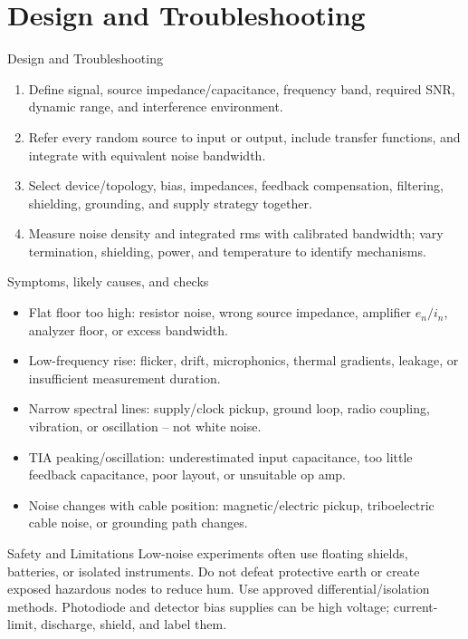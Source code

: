 \documentclass[10pt,letterpaper]{article}
\begin{document}
\section{Design and Troubleshooting}
\begin{CornellExamBox}{Design and Troubleshooting}
\begin{enumerate}
  \item Define signal, source impedance/capacitance, frequency band, required SNR, dynamic range, and interference environment.
  \item Refer every random source to input or output, include transfer functions, and integrate with equivalent noise bandwidth.
  \item Select device/topology, bias, impedances, feedback compensation, filtering, shielding, grounding, and supply strategy together.
  \item Measure noise density and integrated rms with calibrated bandwidth; vary termination, shielding, power, and temperature to identify mechanisms.
\end{enumerate}\end{CornellExamBox}
\begin{CornellExamBox}{Symptoms, likely causes, and checks}
\begin{itemize}
  \item Flat floor too high: resistor noise, wrong source impedance, amplifier $e_n/i_n$, analyzer floor, or excess bandwidth.
  \item Low-frequency rise: flicker, drift, microphonics, thermal gradients, leakage, or insufficient measurement duration.
  \item Narrow spectral lines: supply/clock pickup, ground loop, radio coupling, vibration, or oscillation -- not white noise.
  \item TIA peaking/oscillation: underestimated input capacitance, too little feedback capacitance, poor layout, or unsuitable op amp.
  \item Noise changes with cable position: magnetic/electric pickup, triboelectric cable noise, or grounding path changes.
\end{itemize}\end{CornellExamBox}
\begin{CornellWarningBox}{Safety and Limitations}
Low-noise experiments often use floating shields, batteries, or isolated instruments. Do not defeat protective earth or create exposed hazardous nodes to reduce hum. Use approved differential/isolation methods. Photodiode and detector bias supplies can be high voltage; current-limit, discharge, shield, and label them.
\end{CornellWarningBox}
\end{document}
